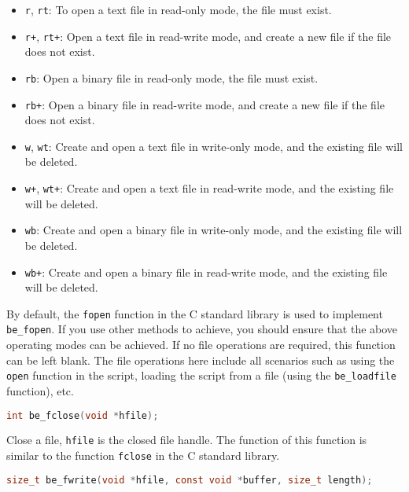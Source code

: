 \begin{itemize}
    \item \texttt{r}, \texttt{rt}: To open a text file in read-only mode, the file must exist.
    \item \texttt{r+}, \texttt{rt+}: Open a text file in read-write mode, and create a new file if the file does not exist.
    \item \texttt{rb}: Open a binary file in read-only mode, the file must exist.
    \item \texttt{rb+}: Open a binary file in read-write mode, and create a new file if the file does not exist.
    \item \texttt{w}, \texttt{wt}: Create and open a text file in write-only mode, and the existing file will be deleted.
    \item \texttt{w+}, \texttt{wt+}: Create and open a text file in read-write mode, and the existing file will be deleted.
    \item \texttt{wb}: Create and open a binary file in write-only mode, and the existing file will be deleted.
    \item \texttt{wb+}: Create and open a binary file in read-write mode, and the existing file will be deleted.
\end{itemize}

By default, the \texttt{fopen} function in the C standard library is used to implement \texttt{be\_fopen}. If you use other methods to achieve, you should ensure that the above operating modes can be achieved. If no file operations are required, this function can be left blank. The file operations here include all scenarios such as using the \texttt{open} function in the script, loading the script from a file (using the \texttt{be\_loadfile} function), etc.


\begin{lstlisting}[language=c, numbers=none]
int be_fclose(void *hfile);
\end{lstlisting}

Close a file, \texttt{hfile} is the closed file handle. The function of this function is similar to the function \texttt{fclose} in the C standard library.


\begin{lstlisting}[language=c, numbers=none]
size_t be_fwrite(void *hfile, const void *buffer, size_t length);
\end{lstlisting}

